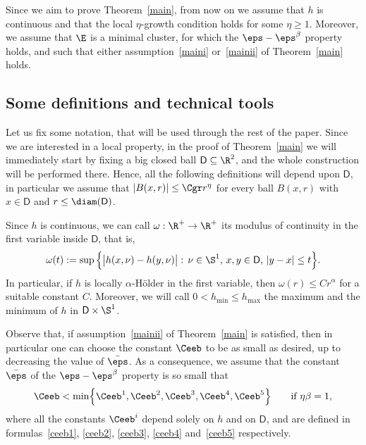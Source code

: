 Since we aim to prove Theorem~\ref{main}, from now on we assume that $h$ is continuous and that the local $\eta$-growth condition holds for some $\eta\geq 1$. Moreover, we assume that $\E$ is a minimal cluster, for which the $\eps-\eps^\beta$ property holds, and such that either assumption~\eqref{maini} or~\eqref{mainii} of Theorem~\ref{main} holds.

\subsection{Some definitions and technical tools}

Let us fix some notation, that will be used through the rest of the paper. Since we are interested in a local property, in the proof of Theorem~\ref{main} we will immediately start by fixing a big closed ball $\mathsf{D}\subseteq\R^2$, and the whole construction will be performed there. Hence, all the following definitions will depend upon $\mathsf{D}$, in particular we assume that $|B(x,r)|\leq \Cgr r^\eta$ for every ball $B(x,r)$ with $x\in \mathsf{D}$ and $r\leq \diam(\mathsf{D})$.

Since $h$ is continuous, we can call $\omega:\R^+\to\R^+$ its modulus of continuity in the first variable inside $\mathsf{D}$, that is,
\[
\omega(t) := \sup \Big\{ \big|h(x,\nu)-h(y,\nu)\big|:\, \nu\in\S^1,\, x,y \in \mathsf{D},\, |y-x|\leq t\Big\}.
\]
In particular, if $h$ is locally $\alpha$-H\"older in the first variable, then $\omega(r) \leq C r^\alpha$ for a suitable constant $C$. Moreover, we will call $0<h_{\min}\leq h_{\max}$ the maximum and the minimum of $h$ in $\mathsf{D}\times\S^1$.

Observe that, if assumption~\eqref{mainii} of Theorem~\ref{main} is satisfied, then in particular one can choose the constant $\Ceeb$ to be as small as desired, up to decreasing the value of $\bar\eps$. As a consequence, we assume that the constant $\bar\eps$ of the $\eps-\eps^\beta$ property is so small that
\begin{equation}\label{Cperissmall}
\Ceeb < \min \Bigl\{ \Ceeb^1, \Ceeb^2, \Ceeb^3, \Ceeb^4, \Ceeb^5\Bigr\} \qquad \hbox{if $\eta\beta=1$},
\end{equation}
where all the constants $\Ceeb^i$ depend solely on $h$ and on $\mathsf{D}$, and are defined in formulas~\eqref{ceeb1}, \eqref{ceeb2}, \eqref{ceeb3}, \eqref{ceeb4} and~\eqref{ceeb5} respectively.

